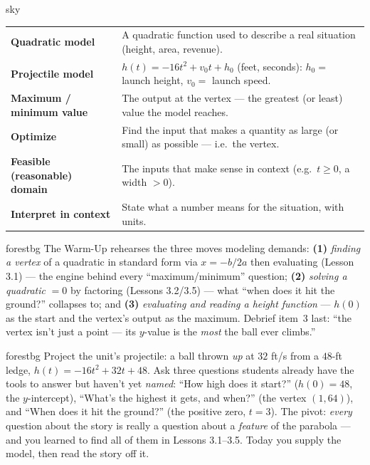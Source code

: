 \documentclass[10pt]{article}
\begin{document}
\begin{skillbox}{sky}
\renewcommand{\arraystretch}{1.3}
\begin{tabularx}{\linewidth}{@{}l X@{}}
\textbf{Quadratic model} & A quadratic function used to describe a real situation (height, area, revenue). \\
\textbf{Projectile model} & $h(t)=-16t^2+v_0t+h_0$ (feet, seconds): $h_0=$ launch height, $v_0=$ launch speed. \\
\textbf{Maximum / minimum value} & The output at the vertex --- the greatest (or least) value the model reaches. \\
\textbf{Optimize} & Find the input that makes a quantity as large (or small) as possible --- i.e.\ the vertex. \\
\textbf{Feasible (reasonable) domain} & The inputs that make sense in context (e.g.\ $t\ge0$, a width $>0$). \\
\textbf{Interpret in context} & State what a number means for the situation, with units. \\
\end{tabularx}
\end{skillbox}

\begin{fixedskillbox}{forestbg}
    The Warm-Up rehearses the three moves modeling demands: \textbf{(1)} \emph{finding a vertex} of a quadratic in
    standard form via $x=-b/2a$ then evaluating (Lesson 3.1) --- the engine behind every ``maximum/minimum''
    question; \textbf{(2)} \emph{solving a quadratic} $=0$ by factoring (Lessons 3.2/3.5) --- what ``when does it hit
    the ground?'' collapses to; and \textbf{(3)} \emph{evaluating and reading a height function} --- $h(0)$ as the
    start and the vertex's output as the maximum. Debrief item~3 last: ``the vertex isn't just a point --- its
    $y$-value is the \emph{most} the ball ever climbs.''
\end{fixedskillbox}

\begin{skillbox}[Hook]{forestbg}
    Project the unit's projectile: a ball thrown \emph{up} at $32$ ft/s from a $48$-ft ledge, $h(t)=-16t^2+32t+48$.
    Ask three questions students already have the tools to answer but haven't yet \emph{named}: ``How high does it
    start?'' ($h(0)=48$, the $y$-intercept), ``What's the highest it gets, and when?'' (the vertex $(1,64)$), and
    ``When does it hit the ground?'' (the positive zero, $t=3$). The pivot: \emph{every} question about the story is
    really a question about a \emph{feature} of the parabola --- and you learned to find all of them in Lessons
    3.1--3.5. Today you supply the model, then read the story off it.
\end{skillbox}
\end{document}
